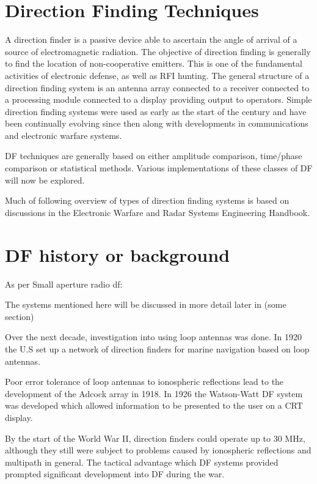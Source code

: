 \section{Direction Finding Techniques}
A direction finder is a passive device able to ascertain the angle of arrival of a source of electromagnetic radiation.
The objective of direction finding is generally to find the location of non-cooperative emitters\cite{poisel2012electronic}.
This is one of the fundamental activities of electronic defense, as well as RFI hunting.
The general structure of a direction finding system is an antenna array connected to a receiver connected to a processing module connected to a display providing output to operators.
Simple direction finding systems were used as early as the start of the  century and have been continually evolving since then along with developments in communications and electronic warfare systems.

DF techniques are generally based on either amplitude comparison, time/phase comparison or statistical methods\cite{tuncer2009classical}. 
Various implementations of these classes of DF will now be explored.

Much of following overview of types of direction finding systems is based on discussions in the Electronic Warfare and Radar Systems Engineering Handbook\cite{center2012electronic}.

\section{DF history or background}
As per Small aperture radio df:

The systems mentioned here will be discussed in more detail later in (some section)

Over the next decade, investigation into using loop antennas was done. In 1920 the U.S set up a network of direction finders for marine navigation based on loop antennas.

Poor error tolerance of loop antennas to ionospheric reflections lead to the development of the Adcock array in 1918. 
In 1926 the Watson-Watt DF system was developed which allowed information to be presented to the user on a CRT display. 

By the start of  the World War II, direction finders could operate up to 30 MHz, although they still were subject to problems caused by ionospheric reflections and multipath in general. 
The tactical advantage which DF systems provided prompted significant development into DF during the war.

